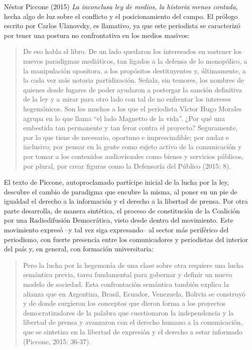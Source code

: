 Néstor Piccone (2015) \emph{La inconclusa ley de medios, la historia menos contada}, hecha algo de luz sobre el conflicto y el posicionamiento del campo. El prólogo escrito por Carlos Ulanovsky, es llamativo, ya que este periodista se caracterizó por tener una postura no confrontativa en los medios masivos:

\begin{quote}
De eso habla el libro. De un lado quedaron los interesados en sostener los nuevos paradigmas mediáticos, tan ligados a la defensa de lo monopólico, a la manipulación opositora, a los propósitos destituyentes y, últimamente, a la cada vez más notoria partidización. Señala, sin temores, los nombres de quienes desde lugares de poder ayudaron a postergar la sanción definitiva de la ley y a mirar para otro lado con tal de no enfrentar los intereses hegemónicos. Son los muchos a los que el periodista Víctor Hugo Morales agrupa en lo que llama ``el lado Magnetto de la vida''. ¿Por qué una embestida tan permanente y tan feroz contra el proyecto? Seguramente, por lo que tiene de necesario, oportuno e imprescindible; por audaz e inclusivo; por pensar en la gente como sujeto activo de la comunicación y por tomar a los contenidos audiovisuales como bienes y servicios públicos, por plural, por crear figuras como la Defensoría del Público (2015: 8).
\end{quote}

El texto de Piccone, autoproclamado partícipe inicial de la lucha por la ley, descubre el cambio de paradigma que encubre la misma, al poner en un pie de igualdad el derecho a la información y el derecho a la libertad de prensa. Por otra parte desarrolla, de manera sintética, el proceso de constitución de la Coalición por una Radiodifusión Democrática, visto desde dentro del movimiento. Este movimiento expresó --y tal vez siga expresando-- al sector más periférico del periodismo, con fuerte presencia entre los comunicadores y periodistas del interior del país y, en general, con formación universitaria:

\begin{quote}
Pero la lucha por la hegemonía de una clase sobre otra requiere una lucha semántica previa, tarea fundamental para gobernar y definir un nuevo modelo de sociedad. Esta confrontación semántica también explica la alianza que en Argentina, Brasil, Ecuador, Venezuela, Bolivia se construyó y de donde surgieron los conceptos que dieron forma a los proyectos democratizadores de la palabra que cuestionaron la independencia y la libertad de prensa y avanzaron con el derecho humano a la comunicación, que se sintetiza en la libertad de expresión y el derecho a estar informado (Piccone, 2015: 36-37).
\end{quote}

